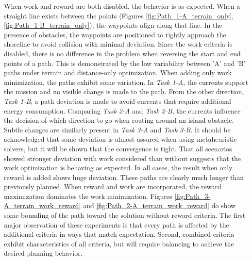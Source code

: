 \documentclass{tamuccthesis}
\begin{document}
When work and reward are both disabled, the behavior is as expected. When a straight line exists between the points (Figures \ref{fig:Path_1-A_terrain_only}, \ref{fig:Path_1-B_terrain_only}), the waypoints align along that line. In the presence of obstacles, the waypoints are positioned to tightly approach the shoreline to avoid collision with minimal deviation. Since the work criteria is disabled, there is no difference in the problem when reversing the start and end points of a path. This is demonstrated by the low variability between 'A' and 'B' paths under terrain and distance-only optimization. When adding only work minimization, the paths exhibit some variation. In \textit{Task 1-A}, the currents support the mission and no visible change is made to the path. From the other direction, \textit{Task 1-B}, a path deviation is made to avoid currents that require additional energy consumption. Comparing \textit{Task 2-A} and \textit{Task 2-B}, the currents influence the decision of which direction to go when routing around an island obstacle. Subtle changes are similarly present in \textit{Task 3-A} and \textit{Task 3-B}. It should be acknowledged that some deviation is almost assured when using metaheuristic solvers, but it will be shown that the convergence is tight. That all scenarios showed stronger deviation with work considered than without suggests that the work optimization is behaving as expected. In all cases, the result when only reward is added shows huge deviation. These paths are clearly much longer than previously planned. When reward and work are incorporated, the reward maximization dominates the work minimization. Figures \ref{fig:Path_3-A_terrain_work_reward} and \ref{fig:Path_2-A_terrain_work_reward} do show some bounding of the path toward the solution without reward criteria. The first major observation of these experiments is that every path is affected by the additional criteria in ways that match expectation. Second, combined criteria exhibit characteristics of all criteria, but will require balancing to achieve the desired planning behavior.
\end{document}
